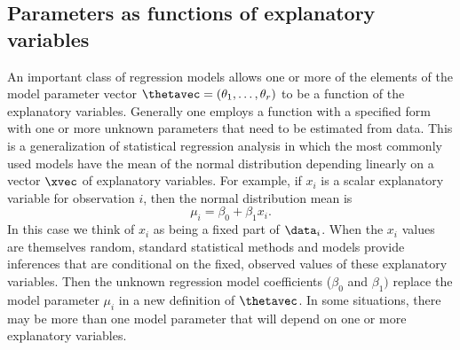 \subsection{Parameters as functions of explanatory variables}
An important class of regression models allows one or more of the
elements of the model parameter vector
$\thetavec=(\theta_1,\ldots,\theta_{r})$ to be a function of the
explanatory variables.  Generally one employs a function with a
specified form with one or more unknown parameters that need to be
estimated from data.  This is a generalization of statistical
regression analysis in which the most commonly used models have the
mean of the normal distribution depending linearly on a vector $\xvec$
of explanatory variables. For example, if $x_{i}$ is a scalar
explanatory variable for observation $i$, then the normal distribution
mean is
\begin{displaymath}
\mu_{i} = \beta_{0} + \beta_{1}x_{i}.
\end{displaymath}
In this case we think of $x_{i}$ as being a fixed part of
$\data_{i}$. When the $x_{i}$ values are themselves random, standard
statistical methods and models provide inferences that are conditional
on the fixed, observed values of these explanatory variables. Then the
unknown regression model coefficients ($\beta_{0}$ and $\beta_{1})$
replace the model parameter $\mu_{i}$ in a new definition of
$\thetavec$.  In some situations, there may be more than one model
parameter that will depend on one or more explanatory variables.

